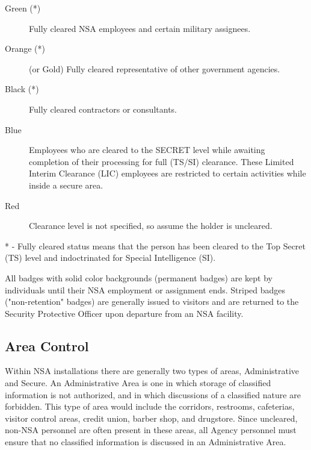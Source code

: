 \documentclass[a4]{article}
\begin{document}
\begin{description}
\item [Green (*)]       Fully cleared NSA employees and certain military
                        assignees.

\item [Orange (*)]      (or Gold) Fully cleared representative of other
                        government agencies.

\item [Black (*)]       Fully cleared contractors or consultants.

\item [Blue]            Employees who are cleared to the SECRET level while
                        awaiting completion of their processing for full
                        (TS/SI) clearance.  These Limited Interim Clearance
                        (LIC) employees are restricted to certain activities
                        while inside a secure area.

\item [Red]             Clearance level is not specified, so assume the holder
                        is uncleared.
\end{description}

* - Fully cleared status means that the person has been cleared to the Top
Secret (TS) level and indoctrinated for Special Intelligence (SI).

All badges with solid color backgrounds (permanent badges) are kept by
individuals until their NSA employment or assignment ends.  Striped badges
("non-retention" badges) are generally issued to visitors and are returned to
the Security Protective Officer upon departure from an NSA facility.

\subsection{Area Control}

Within NSA installations there are generally two types of areas,
Administrative and Secure.  An Administrative Area is one in which storage of
classified information is not authorized, and in which discussions of a
classified nature are forbidden.  This type of area would include the
corridors, restrooms, cafeterias, visitor control areas, credit union, barber
shop, and drugstore.  Since uncleared, non-NSA personnel are often present in
these areas, all Agency personnel must ensure that no classified information is
discussed in an Administrative Area.
\end{document}
